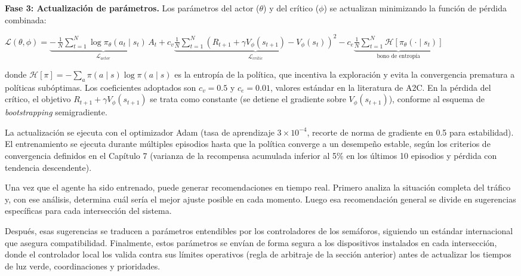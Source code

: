 \documentclass[12pt,a4paper,oneside]{report}
\newenvironment{centeredmath}
  {\begin{center}\begin{adjustbox}{max width=0.96\linewidth}\(\displaystyle}
  {\)\end{adjustbox}\end{center}}
\begin{document}
\textbf{Fase 3: Actualización de parámetros.} Los parámetros del actor (\(\theta\)) y del crítico (\(\phi\)) se actualizan minimizando la función de pérdida combinada:

\begin{centeredmath}
\mathcal{L}(\theta, \phi) = \underbrace{-\,\frac{1}{N}\sum_{t = 1}^{N}\log \pi_{\theta}(a_{t} \mid s_{t})\, A_{t}}_{\mathcal{L}_{actor}}
+ c_{v}\underbrace{\frac{1}{N}\sum_{t = 1}^{N}\left(R_{t+1} + \gamma V_{\phi}(s_{t+1}) - V_{\phi}(s_{t})\right)^{2}}_{\mathcal{L}_{critic}}
- c_{e}\underbrace{\frac{1}{N}\sum_{t = 1}^{N}\mathcal{H}\!\left[\pi_{\theta}(\cdot \mid s_{t})\right]}_{\text{bono de entropía}}
\end{centeredmath}

donde \(\mathcal{H}[\pi] = -\sum_{a}\pi(a \mid s)\log\pi(a \mid s)\) es la entropía de la política, que incentiva la exploración y evita la convergencia prematura a políticas subóptimas. Los coeficientes adoptados son \(c_{v} = 0.5\) y \(c_{e} = 0.01\), valores estándar en la literatura de A2C. En la pérdida del crítico, el objetivo \(R_{t+1} + \gamma V_{\phi}(s_{t+1})\) se trata como constante (se detiene el gradiente sobre \(V_{\phi}(s_{t+1})\)), conforme al esquema de \emph{bootstrapping} semigradiente.

La actualización se ejecuta con el optimizador Adam (tasa de aprendizaje \(3 \times 10^{-4}\), recorte de norma de gradiente en 0.5 para estabilidad). El entrenamiento se ejecuta durante múltiples episodios hasta que la política converge a un desempeño estable, según los criterios de convergencia definidos en el Capítulo 7 (varianza de la recompensa acumulada inferior al 5\% en los últimos 10 episodios y pérdida con tendencia descendente).

Una vez que el agente ha sido entrenado, puede generar recomendaciones en tiempo real. Primero analiza la situación completa del tráfico y, con ese análisis, determina cuál sería el mejor ajuste posible en cada momento. Luego esa recomendación general se divide en sugerencias específicas para cada intersección del sistema.

Después, esas sugerencias se traducen a parámetros entendibles por los controladores de los semáforos, siguiendo un estándar internacional que asegura compatibilidad. Finalmente, estos parámetros se envían de forma segura a los dispositivos instalados en cada intersección, donde el controlador local los valida contra sus límites operativos (regla de arbitraje de la sección anterior) antes de actualizar los tiempos de luz verde, coordinaciones y prioridades.
\end{document}
